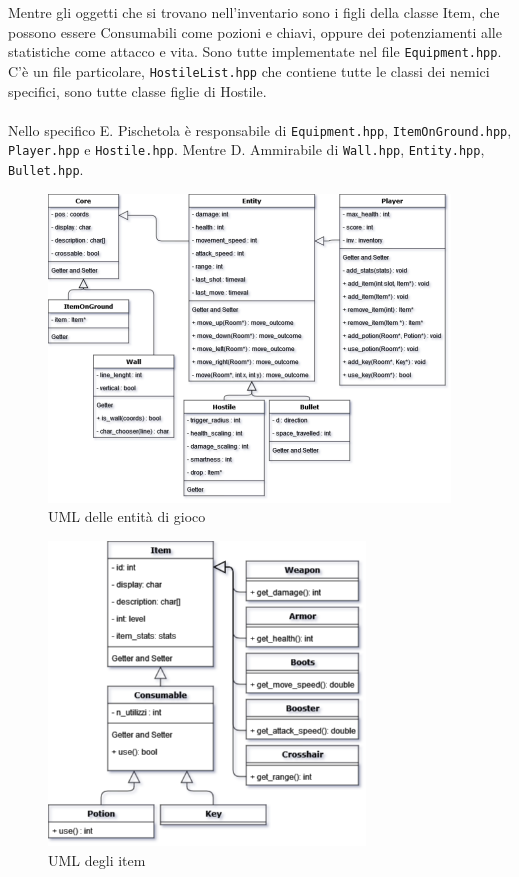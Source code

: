\documentclass{article}
\begin{document}
Mentre gli oggetti che si trovano nell'inventario sono i figli della classe Item, che possono essere Consumabili come pozioni e chiavi, oppure dei potenziamenti alle statistiche come attacco e vita. Sono tutte implementate nel file \texttt{Equipment.hpp}.
C'è un file particolare, \texttt{HostileList.hpp} che contiene tutte le classi dei nemici specifici, sono tutte classe figlie di Hostile.
\\\\
Nello specifico E. Pischetola è responsabile di \texttt{Equipment.hpp}, \texttt{ItemOnGround.hpp}, \texttt{Player.hpp} e \texttt{Hostile.hpp}.
Mentre D. Ammirabile di \texttt{Wall.hpp}, \texttt{Entity.hpp}, \texttt{Bullet.hpp}.

\begin{figure}[!ht]
    \centering
    \includegraphics[width=0.95\textwidth]{UML_Prog_Programmazione.png}
    \caption{UML delle entità di gioco}
    \label{fig:1}
\end{figure}
\FloatBarrier
\begin{figure}[!ht]
    \centering
    \includegraphics[width=0.75\textwidth]{UML_Prog_Programmazione_item.png}
    \caption{UML degli item}
    \label{fig:2}
\end{figure}
\FloatBarrier
\end{document}
